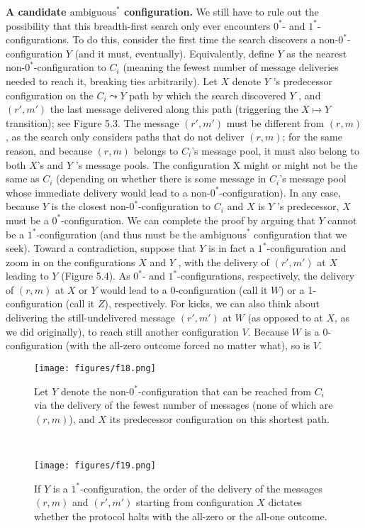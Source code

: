 \noindent
\textbf{A candidate $\text{ambiguous}^*$ configuration.} We still have to rule out the possibility that
this breadth-first search only ever encounters $0^*$- and $1^*$-configurations. To do this, consider the first time the search discovers a non-$0^*$-configuration $Y$ (and it must, eventually). Equivalently, define $Y$ as the nearest non-$0^*$-configuration to $C_i$ (meaning the fewest number of message deliveries needed to reach it, breaking ties arbitrarily). Let $X$ denote $Y$ ’s predecessor configuration on the $C_i \leadsto Y$ path by which the search discovered $Y$ , and $(r', m')$ the
last message delivered along this path (triggering the $X \longmapsto Y$ transition); see Figure 5.3. The
message $(r', m')$ must be different from $(r, m)$, as the search only considers paths that do not
deliver $(r, m)$; for the same reason, and because $(r, m)$ belongs to $C_i$’s message pool, it must also belong to both $X$’s and $Y$ ’s message pools. The configuration X might or might not be the same as $C_i$ (depending on whether there is some message in $C_i$’s message pool whose
immediate delivery would lead to a non-$0^*$-configuration). In any case, because $Y$ is the
closest non-$0^*$-configuration to $C_i$ and $X$ is $Y$ ’s predecessor, $X$ must be a $0^*$-configuration.
We can complete the proof by arguing that $Y$ cannot be a $1^*$-configuration (and thus must be the $\text{ambiguous}^*$ configuration that we seek). Toward a contradiction, suppose that
$Y$ is in fact a $1^*$-configuration and zoom in on the configurations $X$ and $Y$ , with the delivery
of $(r', m')$ at $X$ leading to $Y$ (Figure 5.4). As $0^*$- and $1^*$-configurations, respectively, the
delivery of $(r, m)$ at $X$ or $Y$ would lead to a 0-configuration (call it $W$) or a 1-configuration
(call it $Z$), respectively. For kicks, we can also think about delivering the still-undelivered
message $(r', m')$ at $W$ (as opposed to at $X$, as we did originally), to reach still another
configuration $V$. Because $W$ is a 0-configuration (with the all-zero outcome forced no matter
what), so is $V$.\\

\begin{figure}[h]
    \centering
    \texttt{[image: figures/f18.png]}
    \caption{Let $Y$ denote the non-$0^*$-configuration that can be reached from $C_i$ via the delivery of the fewest number of messages (none of which are $(r, m)$), and $X$ its predecessor
configuration on this shortest path.}
    \label{fig:mesh1}
\end{figure}\\
\begin{figure}[h]
    \centering
    \texttt{[image: figures/f19.png]}
    \caption{ If $Y$ is a $1^*$-configuration, the order of the delivery of the messages $(r, m)$
and $(r', m')$ starting from configuration $X$ dictates whether the protocol halts with the
all-zero or the all-one outcome.}
    \label{fig:mesh1}
\end{figure}\\

